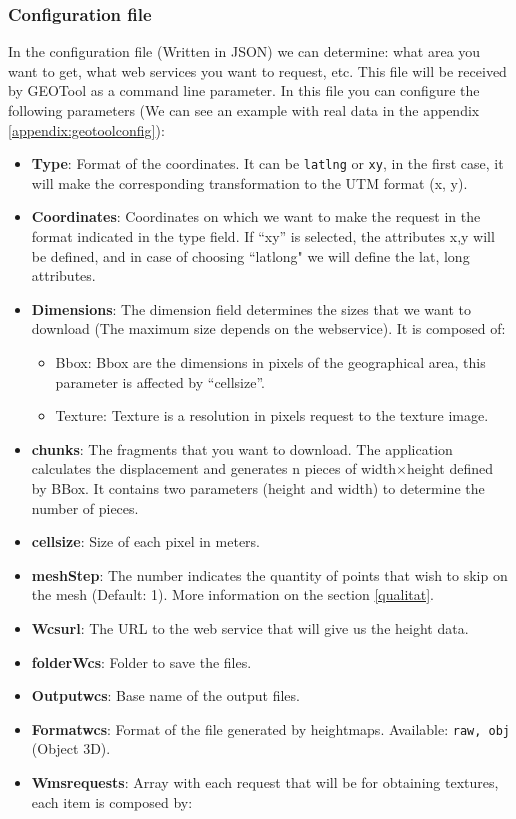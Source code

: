 \documentclass[10pt,a4paper,twocolumn,twoside]{article}
\begin{document}
\subsubsection{Configuration file}
\label{section:configfilegeotool}
In the configuration file (Written in JSON) we can determine: what area you want to get, what web services you want to request, etc. This file will be received by GEOTool as a command line parameter. In this file you can configure the following parameters (We can see an example with real data in the appendix \ref{appendix:geotoolconfig}):

\begin{itemize}
\setlength\itemsep{0em}
  \item \textbf{Type}: Format of the coordinates. It can be \texttt{latlng} or \texttt{xy}, in the first case, it will make the corresponding transformation to the UTM format (x, y).
  
  \item \textbf{Coordinates}: Coordinates on which we want to make the request in the format indicated in the type field. If ``xy'' is selected, the attributes x,y will be defined, and in case of choosing ``latlong" we will define the lat, long attributes.

  \item \textbf{Dimensions}: The dimension field determines the sizes that we want to download (The maximum size depends on the webservice). It is composed of:
  
  \begin{itemize}
  \setlength\itemsep{0em}
  \vspace{-0.2cm}
    \item Bbox: Bbox are the dimensions in pixels of the geographical area, this parameter is affected by ``cellsize''.
    \item Texture: Texture is a resolution in pixels request to the texture image.
  \end{itemize}
  
  \item \textbf{chunks}: The fragments that you want to download. The application calculates the displacement and generates n pieces of width$\times$height defined by BBox. It contains two parameters (height and width) to determine the number of pieces.
  \item \textbf{cellsize}: Size of each pixel in meters.
  \item \textbf{meshStep}: The number indicates the quantity of points that wish to skip on the mesh (Default: 1). More information on the section \ref{qualitat}.
  \item \textbf{Wcsurl}: The URL to the web service that will give us the height data.
  \item \textbf{folderWcs}: Folder to save the files.
  \item \textbf{Outputwcs}: Base name of the output files.
  \item \textbf{Formatwcs}: Format of the file generated by heightmaps. Available: \texttt{raw, obj} (Object 3D).
  \item \textbf{Wmsrequests}: Array with each request that will be for obtaining textures, each item is composed by:
  

\end{itemize}
\end{document}
